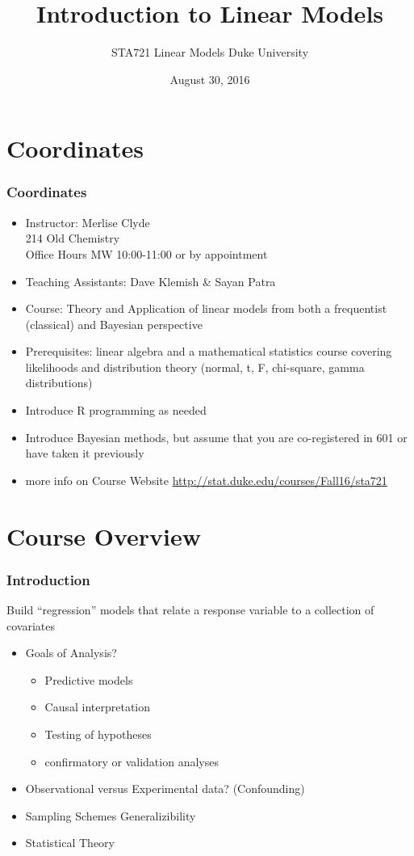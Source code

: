 \documentclass[handout]{beamer}
\title{Introduction to Linear Models}
\institute{Merlise Clyde}
\author{STA721 Linear Models Duke University \\
}
\date{August 30, 2016}
\begin{document}
\maketitle
\section{Coordinates}
\begin{frame}
  \frametitle{Coordinates}
\begin{itemize}
\item Instructor: Merlise Clyde   \\ 214 Old Chemistry \\
 Office Hours MW 10:00-11:00 or  by appointment
\item Teaching Assistants:  Dave Klemish \& Sayan Patra

\item Course: Theory and Application of linear models from both a
frequentist (classical) and Bayesian perspective \pause
\item Prerequisites:   linear algebra and a mathematical statistics
  course covering likelihoods and distribution theory (normal, t, F,
  chi-square, gamma distributions) \pause
\item Introduce  R programming as needed \pause
\item Introduce  Bayesian methods, but assume that you are
  co-registered in 601 or have taken it previously \pause
\item more info on Course Website
  \url{http://stat.duke.edu/courses/Fall16/sta721}
\end{itemize}
  \end{frame}

\section{Course Overview}
\begin{frame}
  \frametitle{Introduction}
  Build ``regression'' models that relate a response variable to a
  collection of covariates  \pause
  \begin{itemize}
  \item Goals of Analysis?  \pause
    \begin{itemize}
    \item Predictive models 
    \item Causal interpretation
    \item Testing of hypotheses
    \item confirmatory  or validation analyses    
    \end{itemize}
 \item Observational versus Experimental data? \pause (Confounding) \pause
 \item Sampling Schemes \pause  Generalizibility \pause
 \item Statistical Theory \pause 
  \end{itemize}
\end{frame}
\end{document}
